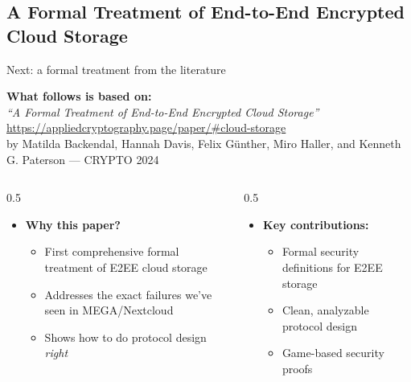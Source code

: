 \ifdefined\PRESENTATION\else\PassOptionsToClass{handout}{beamer}\fi\documentclass[aspectratio=169, lualatex]{beamer}
\begin{document}
\subsection{A Formal Treatment of End-to-End Encrypted Cloud Storage}

\begin{frame}{Next: a formal treatment from the literature}
	\begin{center}
		\textbf{What follows is based on:}\\
		\vspace{0.3cm}
		\textit{``A Formal Treatment of End-to-End Encrypted Cloud Storage''}\\
		{\tiny\url{https://appliedcryptography.page/paper/\#cloud-storage}}\\
		\vspace{0.2cm}
		{\footnotesize by Matilda Backendal, Hannah Davis, Felix G\"unther, Miro Haller, and Kenneth G. Paterson --- CRYPTO 2024}
	\end{center}
	\begin{columns}[t]
		\begin{column}{0.5\textwidth}
			\begin{itemize}
				\item \textbf{Why this paper?}
				      \begin{itemize}
					      \item First comprehensive formal treatment of E2EE cloud storage
					      \item Addresses the exact failures we've seen in MEGA/Nextcloud
					      \item Shows how to do protocol design \textit{right}
				      \end{itemize}
			\end{itemize}
		\end{column}
		\begin{column}{0.5\textwidth}
			\begin{itemize}
				\item \textbf{Key contributions:}
				      \begin{itemize}
					      \item Formal security definitions for E2EE storage
					      \item Clean, analyzable protocol design
					      \item Game-based security proofs
				      \end{itemize}
			\end{itemize}
		\end{column}
	\end{columns}
\end{frame}
\end{document}
